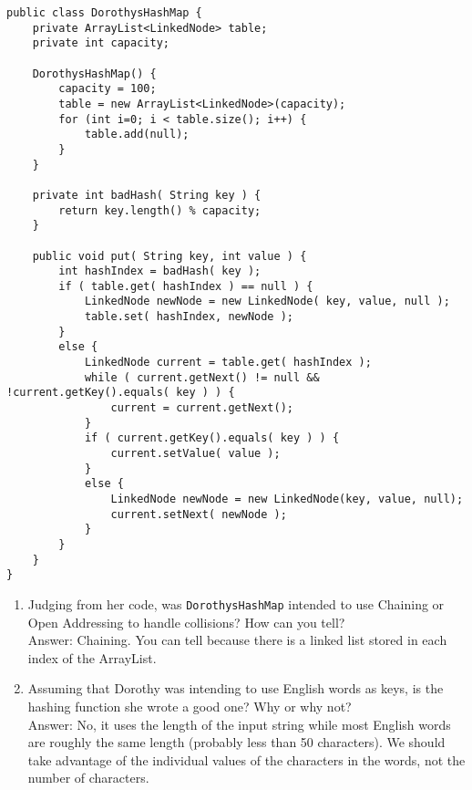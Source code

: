 \documentclass[11pt]{article}
\newenvironment{answer}{\large\lstset{basicstyle=\large\ttfamily}\color{white} \small{Answer:}}{}
\newenvironment{answer}{\large\lstset{basicstyle=\large\ttfamily}\color{red} \small{Answer:}}{}
\begin{document}
\begin{enumerate}
\begin{lstlisting}
public class DorothysHashMap {
	private ArrayList<LinkedNode> table;
	private int capacity;
    
	DorothysHashMap() {
		capacity = 100;
		table = new ArrayList<LinkedNode>(capacity);
		for (int i=0; i < table.size(); i++) {
			table.add(null);
		}
	}
    
	private int badHash( String key ) {
		return key.length() % capacity;
	}
    
	public void put( String key, int value ) {
		int hashIndex = badHash( key );
		if ( table.get( hashIndex ) == null ) {
			LinkedNode newNode = new LinkedNode( key, value, null );
			table.set( hashIndex, newNode );
		}
		else {
			LinkedNode current = table.get( hashIndex );
			while ( current.getNext() != null && !current.getKey().equals( key ) ) {
				current = current.getNext();
			}
			if ( current.getKey().equals( key ) ) {
				current.setValue( value );
			}
			else {
				LinkedNode newNode = new LinkedNode(key, value, null);
				current.setNext( newNode );
			}
		}
	}
}
\end{lstlisting}


\begin{enumerate}
\item Judging from her code, was {\tt DorothysHashMap} intended to use Chaining or Open Addressing to handle collisions? How can you tell? \\
\begin{answer}
Chaining. You can tell because there is a linked list stored in each index of the ArrayList.
\end{answer}



\item Assuming that Dorothy was intending to use English words as keys, is the hashing function she wrote a good one? Why or why not? \\
\begin{answer}
No, it uses the length of the input string while most English words are roughly the same length (probably less than 50 characters). We should take advantage of the individual values of the characters in the words, not the number of characters.  
\end{answer}




\end{enumerate}
\end{enumerate}
\end{document}
